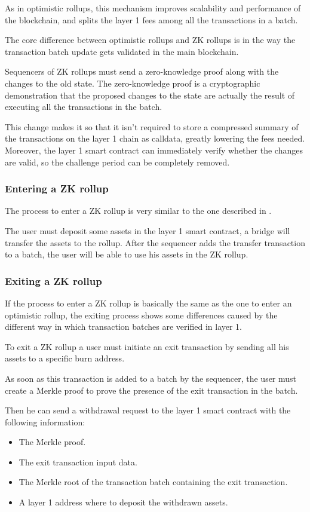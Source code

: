 \documentclass[12pt]{article}
\begin{document}
As in optimistic rollups, this mechanism improves scalability and performance of the blockchain, and splits the layer 1 fees among all the transactions in a batch.

The core difference between optimistic rollups and ZK rollups is in the way the transaction batch update gets validated in the main blockchain.

Sequencers of ZK rollups must send a zero-knowledge proof along with the changes to the old state. The zero-knowledge proof is a cryptographic demonstration that the proposed changes to the state are actually the result of executing all the transactions in the batch.

This change makes it so that it isn't required to store a compressed summary of the transactions on the layer 1 chain as calldata, greatly lowering the fees needed. Moreover, the layer 1 smart contract can immediately verify whether the changes are valid, so the challenge period can be completely removed.

\subsubsection{Entering a ZK rollup} \label{subsubsection:entering_zk_rollup}
The process to enter a ZK rollup is very similar to the one described in .

The user must deposit some assets in the layer 1 smart contract, a bridge will transfer the assets to the rollup. After the sequencer adds the transfer transaction to a batch, the user will be able to use his assets in the ZK rollup.

\subsubsection{Exiting a ZK rollup} \label{subsubsection:exiting_zk_rollup}
If the process to enter a ZK rollup is basically the same as the one to enter an optimistic rollup, the exiting process shows some differences caused by the different way in which transaction batches are verified in layer 1.

To exit a ZK rollup a user must initiate an exit transaction by sending all his assets to a specific burn address.

As soon as this transaction is added to a batch by the sequencer, the user must create a Merkle proof to prove the presence of the exit transaction in the batch.

Then he can send a withdrawal request to the layer 1 smart contract with the following information:
\begin{itemize}
    \item The Merkle proof.
    \item The exit transaction input data.
    \item The Merkle root of the transaction batch containing the exit transaction.
    \item A layer 1 address where to deposit the withdrawn assets.
\end{itemize}
\end{document}
